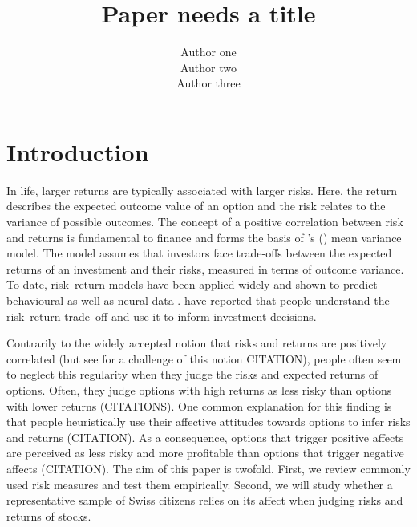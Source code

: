 \documentclass[a4paper,doc, natbib]{apa6} %
\title{Paper needs a title}
\author{Author one\\Author two\\Author three}
\affiliation{University of Basel}
\begin{document}
\maketitle
\section{Introduction}
In life, larger returns are typically associated with larger risks. Here, the return describes the expected outcome value of an option and the risk relates to the variance of possible outcomes. The concept of a positive correlation between risk and returns is fundamental to finance and forms the basis of \citeauthor{Markowitz1952}'s (\citeyear{Markowitz1952}) mean variance model. The model assumes that investors face trade-offs between the expected returns of an investment and their risks, measured in terms of outcome variance. To date, risk--return models have been applied widely \citep[e.g.,][]{Weber2008, Mohr2010a} and shown to predict behavioural as well as neural data \citep{Mohr2010a}. \cite{Sunden1998} have reported that people understand the risk--return trade--off and use it to inform investment decisions.


Contrarily to the widely accepted notion that risks and returns are positively correlated (but see for a challenge of this notion CITATION), people often seem to neglect this regularity when they judge the risks and expected returns of options. Often, they judge options with high returns as less risky than options with lower returns (CITATIONS). One common explanation for this finding is that people heuristically use their affective attitudes towards options to infer risks and returns (CITATION). As a consequence, options that trigger positive affects are perceived as less risky and more profitable than options that trigger negative affects (CITATION). 
The aim of this paper is twofold. First, we review commonly used risk measures and test them empirically. Second, we will study whether a representative sample of Swiss citizens relies on its affect when judging risks and returns of stocks.
\end{document}
